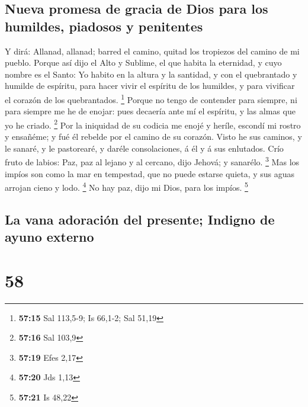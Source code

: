 \hypertarget{nueva-promesa-de-gracia-de-dios-para-los-humildes-piadosos-y-penitentes}{%
\subsection{Nueva promesa de gracia de Dios para los humildes, piadosos
y
penitentes}\label{nueva-promesa-de-gracia-de-dios-para-los-humildes-piadosos-y-penitentes}}

 Y dirá: Allanad, allanad; barred el camino, quitad los
tropiezos del camino de mi pueblo.  Porque así dijo el
Alto y Sublime, el que habita la eternidad, y cuyo nombre es el Santo:
Yo habito en la altura y la santidad, y con el quebrantado y humilde de
espíritu, para hacer vivir el espíritu de los humildes, y para vivificar
el corazón de los quebrantados. \footnote{\textbf{57:15} Sal 113,5-9; Is
  66,1-2; Sal 51,19}  Porque no tengo de contender para
siempre, ni para siempre me he de enojar: pues decaería ante mí el
espíritu, y las almas que yo he criado. \footnote{\textbf{57:16} Sal
  103,9}  Por la iniquidad de su codicia me enojé y
heríle, escondí mi rostro y ensañéme; y fué él rebelde por el camino de
su corazón.  Visto he sus caminos, y le sanaré, y le
pastorearé, y daréle consolaciones, á él y á sus enlutados.
 Crío fruto de labios: Paz, paz al lejano y al cercano,
dijo Jehová; y sanarélo. \footnote{\textbf{57:19} Efes 2,17}
 Mas los impíos son como la mar en tempestad, que no
puede estarse quieta, y sus aguas arrojan cieno y lodo. \footnote{\textbf{57:20}
  Jds 1,13}  No hay paz, dijo mi Dios, para los impíos.
\footnote{\textbf{57:21} Is 48,22}

\hypertarget{la-vana-adoraciuxf3n-del-presente-indigno-de-ayuno-externo}{%
\subsection{La vana adoración del presente; Indigno de ayuno
externo}\label{la-vana-adoraciuxf3n-del-presente-indigno-de-ayuno-externo}}

\hypertarget{section-57}{%
\section{58}\label{section-57}}

